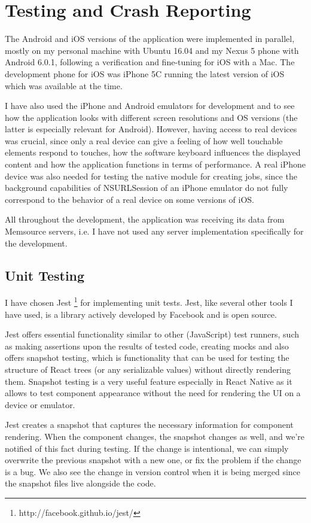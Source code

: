 \chapter{Testing and Crash Reporting}

The Android and iOS versions of the application were implemented in parallel, mostly on my personal machine with Ubuntu 16.04 and my Nexus 5 phone with Android 6.0.1, following a verification and fine-tuning for iOS with a Mac. The development phone for iOS was iPhone 5C running the latest version of iOS which was available at the time. 

I have also used the iPhone and Android emulators for development and to see how the application looks with different screen resolutions and OS versions (the latter is especially relevant for Android). However, having access to real devices was crucial, since only a real device can give a feeling of how well touchable elements respond to touches, how the software keyboard influences the displayed content and how the application functions in terms of performance. A real iPhone device was also needed for testing the native module for creating jobs, since the background capabilities of NSURLSession of an iPhone emulator do not fully correspond to the behavior of a real device on some versions of iOS.

All throughout the development, the application was receiving its data from Memsource servers, i.e. I have not used any server implementation specifically for the development.


\section{Unit Testing}
I have chosen Jest \footnote{http://facebook.github.io/jest/} for implementing unit tests. Jest, like several other tools I have used, is a library actively developed by Facebook and is open source. 

Jest offers essential functionality similar to other (JavaScript) test runners, such as making assertions upon the results of tested code, creating mocks and also offers snapshot testing, which is functionality that can be used for testing the structure of React trees (or any serializable values) without directly rendering them. Snapshot testing is a very useful feature especially in React Native as it allows to test component appearance without the need for rendering the UI on a device or emulator. 

Jest creates a snapshot that captures the necessary information for component rendering. When the component changes, the snapshot changes as well, and we're notified of this fact during testing. If the change is intentional, we can simply overwrite the previous snapshot with a new one, or fix the problem if the change is a bug. We also see the change in version control when it is being merged since the snapshot files live alongside the code. 

